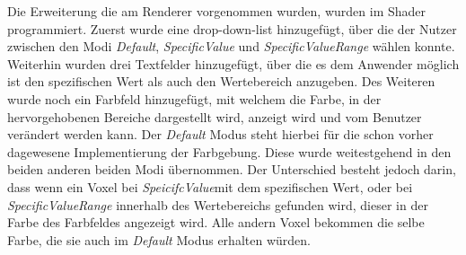 Die Erweiterung die am Renderer vorgenommen wurden, wurden im Shader programmiert. Zuerst wurde eine drop-down-list hinzugefügt, über die der Nutzer zwischen den Modi \textit{Default}, \textit{SpecificValue} und \textit{SpecificValueRange} wählen konnte. Weiterhin wurden drei Textfelder hinzugefügt, über die es dem Anwender möglich ist den spezifischen Wert als auch den Wertebereich anzugeben. Des Weiteren wurde noch ein Farbfeld hinzugefügt, mit welchem die Farbe, in der hervorgehobenen Bereiche dargestellt wird, anzeigt wird und vom Benutzer verändert werden kann.
\newline
Der \textit{Default} Modus steht hierbei für die schon vorher dagewesene Implementierung der Farbgebung. Diese wurde weitestgehend in den beiden anderen beiden Modi übernommen. Der Unterschied besteht jedoch darin, dass wenn ein Voxel bei \textit{SpeicifcValue}mit dem spezifischen Wert, oder bei \textit{SpecificValueRange} innerhalb des Wertebereichs gefunden wird, dieser in der Farbe des Farbfeldes angezeigt wird. Alle andern Voxel bekommen die selbe Farbe, die sie auch im \textit{Default} Modus erhalten würden.























































